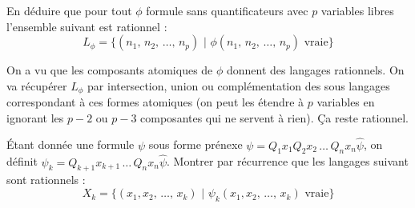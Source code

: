 \documentclass[12pt,letterpaper,boxed]{hmcpset}
\begin{document}
\begin{problem}[Question 3]
En déduire que pour tout $\phi$ formule sans quantificateurs avec $p$ variables libres l'ensemble suivant est rationnel : \\
$$ L_{\phi} = \{ (n_{1}, \, n_{2}, \, \dots , \, n_{p}) \, \, | \, \, \phi(n_{1}, \, n_{2}, \, \dots , \, n_{p}) \text{ vraie} \}$$

\end{problem}

\begin{solution}

On a vu que les composants atomiques de $\phi$ donnent des langages rationnels. On va récupérer $L_{\phi}$ par intersection, union ou complémentation des sous langages correspondant à ces formes atomiques (on peut les étendre à $p$ variables en ignorant les $p-2$ ou $p-3$ composantes qui ne servent à rien). Ça reste rationnel.

\end{solution}


\begin{problem}[Question 4]
Étant donnée une formule $\psi$ sous forme prénexe $\psi = Q_{1}x_{1}Q_{2}x_{2} \, \dots \, Q_{n}x_{n}\hat \psi$, on définit $\psi_k = Q_{k+1}x_{k+1} \, \dots \, Q_{n}x_{n}\hat \psi$.
Montrer par récurrence que les langages suivant sont rationnels :%
$$ X_{k} = \{(x_{1}, x_{2}, \, \dots , \, x_{k}) \, \, | \, \, \psi_k(x_{1}, x_{2}, \, \dots , \, x_{k}) \text{ vraie} \}$$
\end{problem}
\end{document}
